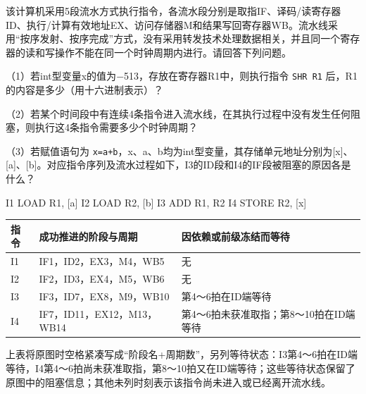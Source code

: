 该计算机采用5段流水方式执行指令，各流水段分别是取指IF、译码/读寄存器ID、执行/计算有效地址EX、访问存储器M和结果写回寄存器WB。流水线采用``按序发射、按序完成''方式，没有采用转发技术处理数据相关，并且同一个寄存器的读和写操作不能在同一个时钟周期内进行。请回答下列问题。

（1）若int型变量x的值为\ensuremath{-}513，存放在寄存器R1中，则执行指令 \texttt{SHR R1} 后，R1的内容是多少（用十六进制表示）？

（2）若某个时间段中有连续4条指令进入流水线，在其执行过程中没有发生任何阻塞，则执行这4条指令需要多少个时钟周期？

（3）若赋值语句为 \texttt{x=\allowbreak{}a+\allowbreak{}b}，x、a、b均为int型变量，其存储单元地址分别为{[}x{]}、{[}a{]}、{[}b{]}。对应指令序列及流水过程如下，I3的ID段和I4的IF段被阻塞的原因各是什么？

\begin{codeblock}[language={}]
I1  LOAD  R1, [a]
I2  LOAD  R2, [b]
I3  ADD   R1, R2
I4  STORE R2, [x]
\end{codeblock}

\par\medskip\noindent\begin{minipage}{\linewidth}\fontsize{9.3}{12}\selectfont\begin{tabularx}{\linewidth}{@{}YYY@{}}
\toprule\noalign{}
\begin{minipage}[b]{\linewidth}\raggedright
指令
\end{minipage} & \begin{minipage}[b]{\linewidth}\raggedright
成功推进的阶段与周期
\end{minipage} & \begin{minipage}[b]{\linewidth}\raggedright
因依赖或前级冻结而等待
\end{minipage} \\
\midrule\noalign{}


I1 & IF1，ID2，EX3，M4，WB5 & 无 \\
I2 & IF2，ID3，EX4，M5，WB6 & 无 \\
I3 & IF3，ID7，EX8，M9，WB10 & 第4～6拍在ID端等待 \\
I4 & IF7，ID11，EX12，M13，WB14 & 第4～6拍未获准取指；第8～10拍在ID端等待 \\
\bottomrule\end{tabularx}
\end{minipage}\par\medskip

上表将原图时空格紧凑写成``阶段名+周期数''，另列等待状态：I3第4～6拍在ID端等待，I4第4～6拍尚未获准取指，第8～10拍又在ID端等待；这些等待状态保留了原图中的阻塞信息；其他未列时刻表示该指令尚未进入或已经离开流水线。

